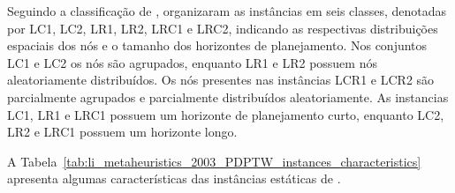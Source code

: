 Seguindo a classificação de \textcite{solomon_algorithms_1987},  
\textcite{li_metaheuristic_2003} organizaram as instâncias em seis classes, 
denotadas por LC1, LC2, LR1, LR2, LRC1 e LRC2, indicando as respectivas 
distribuições espaciais dos nós e o tamanho dos horizontes de planejamento.
Nos conjuntos LC1 e LC2 os nós são agrupados, enquanto LR1 e LR2 possuem nós 
aleatoriamente distribuídos.
Os nós presentes nas instâncias LCR1 e LCR2 são parcialmente agrupados e 
parcialmente distribuídos aleatoriamente.
As instancias LC1, LR1 e LRC1 possuem um horizonte de planejamento curto, 
enquanto LC2, LR2 e LRC1 possuem um horizonte longo.


A Tabela~\ref{tab:li_metaheuristics_2003_PDPTW_instances_characteristics}
apresenta algumas características das instâncias estáticas de
\textcite{li_metaheuristic_2003}.

